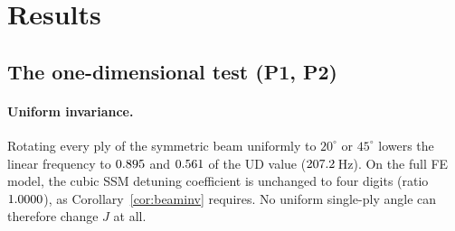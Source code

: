 \section{Results}\label{sec:results}

\subsection{The one-dimensional test (P1, P2)}\label{sec:beamres}
\paragraph{Uniform invariance.} Rotating every ply of the symmetric beam uniformly to
$20^\circ$ or $45^\circ$ lowers the linear frequency to $0.895$ and $0.561$ of the
UD value ($207.2$\,Hz). On the full FE model, the cubic SSM detuning coefficient is
unchanged to four digits (ratio $1.0000$), as Corollary~\ref{cor:beaminv} requires.
No uniform single-ply angle can therefore change $J$ at all.

